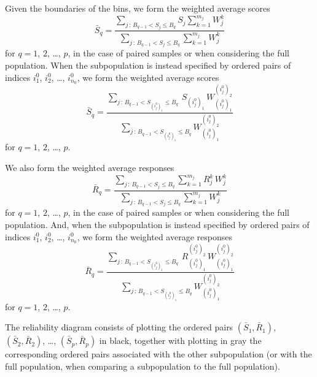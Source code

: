 \documentclass[]{fairmeta}
\begin{document}
Given the boundaries of the bins, we form the weighted average scores
%
\begin{equation}
\bar{S}_q = \frac{\sum_{j\,:\,B_{q-1} < S_j \le B_q}
                  S_j \sum_{k=1}^{m_j} W_j^k}
                 {\sum_{j\,:\,B_{q-1} < S_j \le B_q} \sum_{k=1}^{m_j} W_j^k}
\end{equation}
%
for $q = 1$, $2$, \dots, $p$, in the case of paired samples
or when considering the full population.
When the subpopulation is instead specified by ordered pairs of indices
$i_1^0$, $i_2^0$, \dots, $i_{n_0}^0$, we form the weighted average scores
%
\begin{equation}
\bar{S}_q = \frac{\sum_{j\,:\,B_{q-1} < S_{\left(i_j^0\right)_1} \le B_q} \,
                  S_{\left(i_j^0\right)_1} \,
                  W_{\left(i_j^0\right)_1}^{\left(i_j^0\right)_2}}
                 {\sum_{j\,:\,B_{q-1} < S_{\left(i_j^0\right)_1} \le B_q}
                  W_{\left(i_j^0\right)_1}^{\left(i_j^0\right)_2}}
\end{equation}
%
for $q = 1$, $2$, \dots, $p$.

We also form the weighted average responses
%
\begin{equation}
\bar{R}_q = \frac{\sum_{j\,:\,B_{q-1} < S_j \le B_q}
                  \sum_{k=1}^{m_j} R_j^k \, W_j^k}
                 {\sum_{j\,:\,B_{q-1} < S_j \le B_q} \sum_{k=1}^{m_j} W_j^k}
\end{equation}
%
for $q = 1$, $2$, \dots, $p$, in the case of paired samples
or when considering the full population.
And, when the subpopulation is instead specified by ordered pairs of indices
$i_1^0$, $i_2^0$, \dots, $i_{n_0}^0$, we form the weighted average responses
%
\begin{equation}
\bar{R}_q = \frac{\sum_{j\,:\,B_{q-1} < S_{\left(i_j^0\right)_1} \le B_q} \,
                  R_{\left(i_j^0\right)_1}^{\left(i_j^0\right)_2} \,
                  W_{\left(i_j^0\right)_1}^{\left(i_j^0\right)_2}}
                 {\sum_{j\,:\,B_{q-1} < S_{\left(i_j^0\right)_1} \le B_q}
                  W_{\left(i_j^0\right)_1}^{\left(i_j^0\right)_2}}
\end{equation}
%
for $q = 1$, $2$, \dots, $p$.

The reliability diagram consists of plotting the ordered pairs
$(\bar{S}_1, \bar{R}_1)$, $(\bar{S}_2, \bar{R}_2)$, \dots,
$(\bar{S}_p, \bar{R}_p)$ in black, together with plotting in gray
the corresponding ordered pairs associated with the other subpopulation
(or with the full population, when comparing a subpopulation
to the full population).
\end{document}
